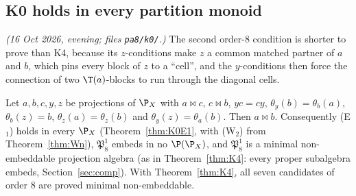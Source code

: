 \subsection{K0 holds in every partition monoid}\label{subsec:K0}

\emph{(16 Oct 2026, evening; files \texttt{pa8/k0/}.)} The second order-$8$ condition is shorter to prove than K4, because its $z$-conditions make $z$ a common matched partner of $a$ and $b$, which pins every block of $z$ to a ``cell'', and the $y$-conditions then force the connection of two $\T(a)$-blocks to run through the diagonal cells.

\begin{theorem}\label{thm:K0}
Let $a,b,c,y,z$ be projections of $\P_X$ with $a\bowtie c$, $c\bowtie b$, $yc=cy$, $\theta_y(b)=\theta_b(a)$, $\theta_b(z)=b$, $\theta_z(a)=\theta_z(b)$ and $\theta_y(z)=\theta_a(b)$. Then $a\bowtie b$. Consequently \textup{(E$_1$)} holds in every $\P_X$ (Theorem~\ref{thm:K0E1}, with (W$_2$) from Theorem~\ref{thm:Wn}), $\mathfrak P_8^1$ embeds in no $\P(\P_X)$, and $\mathfrak P_8^1$ is a minimal non-embeddable projection algebra (as in Theorem~\ref{thm:K4}: every proper subalgebra embeds, Section~\ref{sec:comp}). With Theorem~\ref{thm:K4}, all seven candidates of order $8$ are proved minimal non-embeddable.
\end{theorem}

